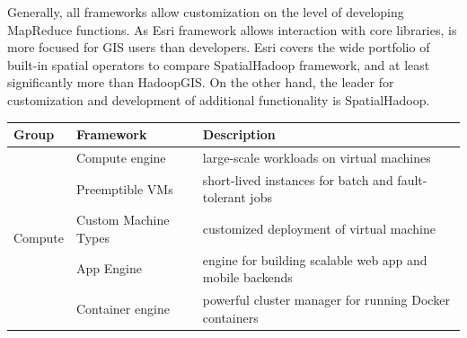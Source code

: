 \documentclass[a4paper,12pt,oneside]{report}
\begin{document}
Generally, all frameworks allow customization on the level of developing MapReduce functions. As Esri 
framework allows interaction with core libraries, is more focused  for GIS users than developers. 
Esri covers the wide portfolio of built-in spatial operators to compare SpatialHadoop framework, 
and at least significantly more than HadoopGIS. On the other hand, the leader for customization and 
development of additional functionality is SpatialHadoop.



 


\begin{table}[!htbp]
\begin{scriptsize}
\centering


\begin{tabular}{@{}|l||l|l|@{}}
\toprule
Group                       & Framework                                                        & Description                                                                                                                                                  \\ \midrule \midrule
\multirow{5}{*}{Compute}    & Compute engine                                                   & large-scale workloads on virtual machines                                                                                                                \\ \cmidrule(l){2-3} 
                            & Preemptible VMs                                                  & short-lived instances for batch and fault-tolerant jobs                                                                                                  \\ \cmidrule(l){2-3} 
                            & Custom Machine Types                                             & customized deployment of virtual machine                                                                                                                 \\ \cmidrule(l){2-3} 
                            & App Engine                                                       & engine for building scalable web app and mobile backends                                                                                                 \\ \cmidrule(l){2-3} 
                            & Container engine                                                 & powerful cluster manager for running Docker containers                                                                                                   \\ \midrule

\end{tabular}
\end{scriptsize}
\end{table}
\end{document}
